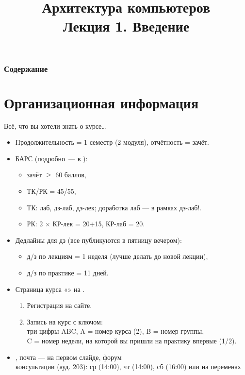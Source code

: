 \newcommand{\h}{%
}



\title[Архитектура компьютеров. Лекция 1]{Архитектура компьютеров\texorpdfstring{\\}{ }Лекция 1. Введение}



\begin{frame}
\titlepage
\end{frame}

\begin{frame}
\frametitle{Содержание}
\tableofcontents[hideallsubsections]
\end{frame}

\section {Организационная информация}

\begin{frame}{Всё, что вы хотели знать о курсе\ldots}
\begin{itemize}[<+->]
	\item Продолжительность = 1 семестр (2 модуля), отчётность = зачёт.
	\item БАРС (подробно~---
		в ):\footnotesize{
		\begin{itemize}
		\item зачёт ${\geqslant}$ 60 баллов,
		\item ТК/РК = 45/55,
		\item ТК: лаб, дз-лаб, дз-лек; доработка лаб — в рамках дз-лаб!.
		\item РК: 2 ${\times}$ КР-лек = 20+15, КР-лаб = 20.
		\end{itemize}}
	\item Дедлайны для дз (все публикуются в пятницу вечером): \footnotesize{
		\begin{itemize}
		\item д/з по лекциям  = 1 неделя (лучше делать до новой лекции),
		\item д/з по практике = 11 дней.
		\end{itemize}}
	\item Страница курса «» на .\footnotesize{
		\begin{enumerate}
		\item Регистрация на сайте.
		\item Запись на курс с ключом:\\
		три цифры ABC, A =  номер курса (2), B = номер группы,\\
		C = номер недели, на которой вы пришли на практику впервые (1/2).
		\end{enumerate}}
	\item {},
		почта — на первом слайде, форум
		\\ \footnotesize{консультации (ауд. 203): ср (14:00), чт (14:00), сб (16:00) или на переменах}
\end{itemize}
\end{frame}

